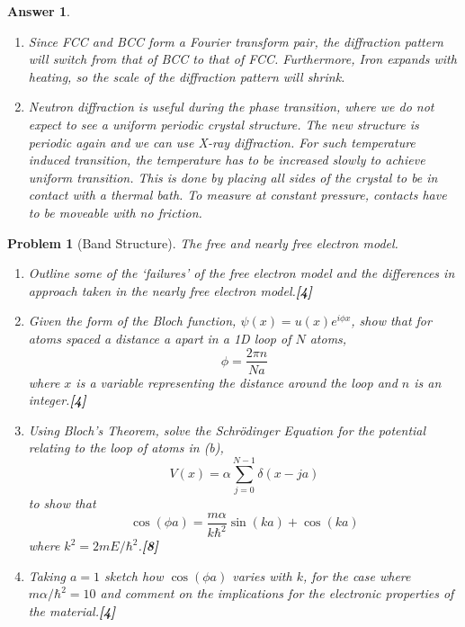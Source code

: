 \documentclass[a4paper]{article}
\newtheorem{ans}{Answer}[subsection]
\theoremstyle{new}
\newtheorem{qns}{Problem}[subsection]
\begin{document}
\begin{ans}
\begin{enumerate}[label=(\alph*)]
i.e. $\alpha=\mathbf{d}\cdot\mathbf{A}=\frac{\alpha\mathbf{a}\cdot(\mathbf{b}\times\mathbf{c})}{[\mathbf{a},\mathbf{b},\mathbf{c}]}$. In materials, we are often concerned with phase shifts from one lattice point to another, so we consider terms like $\mathbf{k}\cdot\mathbf{r}=\frac{2\pi}{\lambda}\mathbf{\hat{k}}\cdot\mathbf{r}$ and so if $\mathbf{k}$ is expressed in terms of the reciprocal lattice, it allows for easier calculation. Reciprocal lattice is also the Fourier transform of the real space lattice, and so describes the Fraunhofer diffraction pattern of crystals.
\item Since FCC and BCC form a Fourier transform pair, the diffraction pattern will switch from that of BCC to that of FCC. Furthermore, Iron expands with heating, so the scale of the diffraction pattern will shrink.
\item Neutron diffraction is useful during the phase transition, where we do not expect to see a uniform periodic crystal structure. The new structure is periodic again and we can use X-ray diffraction. For such temperature induced transition, the temperature has to be increased slowly to achieve uniform transition. This is done by placing all sides of the crystal to be in contact with a thermal bath. To measure at constant pressure, contacts have to be moveable with no friction.
\end{enumerate}
\end{ans}
\newpage
\begin{qns}[Band Structure]
The free and nearly free electron model.
\begin{enumerate}[label=(\alph*)]
\item Outline some of the ‘failures’ of the free electron model and the differences in approach taken in the nearly free electron model.\hfill\textbf{[4]}
\item Given the form of the Bloch function, $\psi(x)=u(x)e^{i\phi x}$, show that for atoms spaced a distance a apart in a 1D loop of $N$ atoms,
$$\phi=\frac{2\pi n}{Na}$$
where $x$ is a variable representing the distance around the loop and $n$ is an integer.\hfill\textbf{[4]}
\item Using Bloch’s Theorem, solve the Schr\"{o}dinger Equation for the potential relating to the loop of atoms in (b),
$$V(x)=\alpha\sum_{j=0}^{N-1}\delta(x-ja)$$
to show that
$$\cos(\phi a)=\frac{m\alpha}{k\hbar^2}\sin(ka)+\cos(ka)$$
where $k^2 = 2mE/\hbar^2$.\hfill\textbf{[8]}
\item Taking $a = 1$ sketch how $\cos(\phi a)$ varies with $k$, for the case where $m\alpha/\hbar^2=10$ and comment on the implications for the electronic properties of the material.\hfill\textbf{[4]}
\end{enumerate}
\begin{mdframed}
\end{mdframed}
\end{qns}
\end{document}
